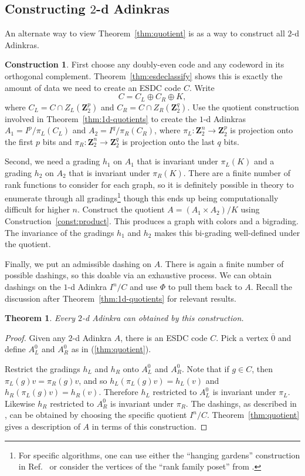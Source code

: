 \documentclass[12pt,twoside,singlespace]{article}
\numberwithin{equation}{section}
\newtheorem{thm}[equation]{Theorem}
\theoremstyle{definition}
\newtheorem{construction}[equation]{Construction}
\newcommand{\ZZ}{\mathbf{Z}}
\begin{document}
\subsection{Constructing $2$-d Adinkras}
An alternate way to view Theorem~\ref{thm:quotient} is as a way to construct all $2$-d Adinkras.

\begin{construction}
First choose any doubly-even code and any codeword in its orthogonal complement. Theorem~\ref{thm:esdeclassify} shows this is exactly the amount of data we need to create an ESDC code $C$.  Write
\[C=C_L\oplus C_R\oplus K,\]
where $C_L=C\cap Z_L(\ZZ_2^p)$ and $C_R=C\cap Z_R(\ZZ_2^q)$. Use the quotient construction involved in Theorem~\ref{thm:1d-quotients} to create the $1$-d Adinkras $A_1=I^p/\pi_L(C_L)$ and $A_2=I^q/\pi_R(C_R)$, where $\pi_L:\ZZ_2^n\to\ZZ_2^p$ is projection onto the first $p$ bits and $\pi_R:\ZZ_2^n\to\ZZ_2^q$ is projection onto the last $q$ bits.

Second, we need a grading $h_1$ on $A_1$ that is invariant under $\pi_L(K)$ and a grading $h_2$ on $A_2$ that is invariant under $\pi_R(K)$. There are a finite number of rank functions to consider for each graph, so it is definitely possible in theory to enumerate through all gradings\footnote{For specific algorithms, one can use either the ``hanging gardens'' construction in Ref.~\cite{d2l:graph-theoretic} or consider the vertices of the ``rank family poset'' from \cite{zhang:adinkras}.} though this ends up being computationally difficult for higher $n$. Construct the quotient $A=(A_1\times A_2)/K$ using Construction~\ref{const:product}.  This produces a graph with colors and a bigrading. The invariance of the gradings $h_1$ and $h_2$ makes this bi-grading well-defined under the quotient.

Finally, we put an admissible dashing on $A$. There is again a finite number of possible dashings, so this doable via an exhaustive process. We can obtain dashings on the $1$-d Adinkra $I^n/C$ and use $\Phi$ to pull them back to $A$. Recall the discussion after Theorem~\ref{thm:1d-quotients} for relevant results. 

\end{construction}

\begin{thm}
Every $2$-d Adinkra can obtained by this construction.
\end{thm}

\begin{proof}
Given any $2$-d Adinkra $A$, there is an ESDC code $C$.  Pick a vertex $\overline{0}$ and define $A_L^0$ and $A_R^0$ as in (\ref{thm:quotient}).

Restrict the gradings $h_L$ and $h_R$ onto $A_L^0$ and $A_R^0$.  Note that if $g\in C$, then $\pi_L(g)v=\pi_R(g)v$, and so $h_L(\pi_L(g)v)=h_L(v)$ and $h_R(\pi_L(g)v)=h_R(v)$.  Therefore $h_L$ restricted to $A_L^0$ is invariant under $\pi_L$.  Likewise $h_R$ restricted to $A_R^0$ is invariant under $\pi_R$. The dashings, as described in \cite{d2l:topology}, can be obtained by choosing the specific quotient $I^n/C$. Theorem~\ref{thm:quotient} gives a description of $A$ in terms of this construction.
\end{proof}
\end{document}
